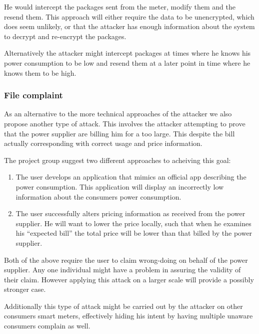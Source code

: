 He would intercept the packages sent from the meter, modify them and the resend them.
This approach will either require the data to be unencrypted, which does seem unlikely, or that the attacker has enough information about the system to decrypt and re-encrypt the packages.

Alternatively the attacker might intercept packages at times where he knows his power consumption to be low and resend them at a later point in time where he knows them to be high.

\subsubsection{File complaint}
As an alternative to the more technical approaches of the attacker we also propose another type of attack.
This involves the attacker attempting to prove that the power supplier are billing him for a too large.
This despite the bill actually corresponding with correct usage and price information.

The project group suggest two different approaches to acheiving this goal:
\begin{enumerate}
  \item The user develops an application that mimics an official app describing the power consumption.
  This application will display an incorrectly low information about the consumers power consumption.
  \item The user successfully alters pricing information as received from the power supplier.
  He will want to lower the price locally, such that when he examines his ``expected bill'' the total price will be lower than that billed by the power supplier.
\end{enumerate}
Both of the above require the user to claim wrong-doing on behalf of the power supplier.
Any one individual might have a problem in assuring the validity of their claim.
However applying this attack on a larger scale will provide a possibly stronger case.

Additionally this type of attack might be carried out by the attacker on other consumers smart meters, effectively hiding his intent by having multiple unaware consumers complain as well.
